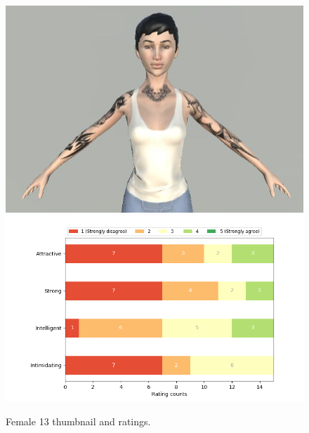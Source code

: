 \begin{figure}[H]
  \includegraphics[width=\linewidth]{Images/Females/13.JPG}
\endminipage\hfill
{}
  \includegraphics[width=\linewidth]{Survey/FRatings/avatar_f13.png}
\endminipage\hfill
\caption{Female 13 thumbnail and ratings.}
\end{figure}


